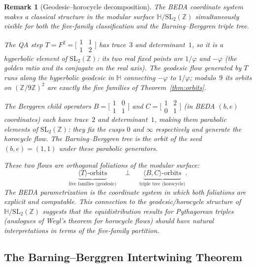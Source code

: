 \documentclass[12pt]{article}
\newtheorem{remark}{Remark}
\begin{document}
\begin{remark}[Geodesic--horocycle decomposition]\label{rem:geodesic}
The BEDA coordinate system makes a classical structure in the modular surface $\mathbb{H}/\mathrm{SL}_2(\mathbb{Z})$ simultaneously visible for both the five-family classification and the Barning--Berggren triple tree.

The QA step $T = F^2 = \bigl[\begin{smallmatrix}1&1\\1&2\end{smallmatrix}\bigr]$ has trace~$3$ and determinant~$1$, so it is a \emph{hyperbolic} element of $\mathrm{SL}_2(\mathbb{Z})$: its two real fixed points are $1/\varphi$ and $-\varphi$ (the golden ratio and its conjugate on the real axis).  The \emph{geodesic flow} generated by $T$ runs along the hyperbolic geodesic in $\mathbb{H}$ connecting $-\varphi$ to $1/\varphi$; modulo~$9$ its orbits on $(\mathbb{Z}/9\mathbb{Z})^2$ are exactly the five families of Theorem~\ref{thm:orbits}.

The Berggren child operators $B = \bigl[\begin{smallmatrix}1&0\\1&1\end{smallmatrix}\bigr]$ and $C = \bigl[\begin{smallmatrix}1&2\\0&1\end{smallmatrix}\bigr]$ (in BEDA $(b,e)$ coordinates) each have trace~$2$ and determinant~$1$, making them \emph{parabolic} elements of $\mathrm{SL}_2(\mathbb{Z})$: they fix the cusps $0$ and $\infty$ respectively and generate the \emph{horocycle flow}.  The Barning--Berggren tree is the orbit of the seed $(b,e)=(1,1)$ under these parabolic generators.

These two flows are \emph{orthogonal foliations} of the modular surface:
\[
  \underbrace{\langle T \rangle\text{-orbits}}_{\text{five families (geodesic)}}
  \quad \perp \quad
  \underbrace{\langle B, C \rangle\text{-orbits}}_{\text{triple tree (horocycle)}}.
\]
The BEDA parametrization is the coordinate system in which both foliations are explicit and computable.  This connection to the geodesic/horocycle structure of $\mathbb{H}/\mathrm{SL}_2(\mathbb{Z})$ suggests that the equidistribution results for Pythagorean triples (analogues of Weyl's theorem for horocycle flows) should have natural interpretations in terms of the five-family partition.
\end{remark}

\subsection{The Barning--Berggren Intertwining Theorem}\label{sec:intertwine}
\end{document}
